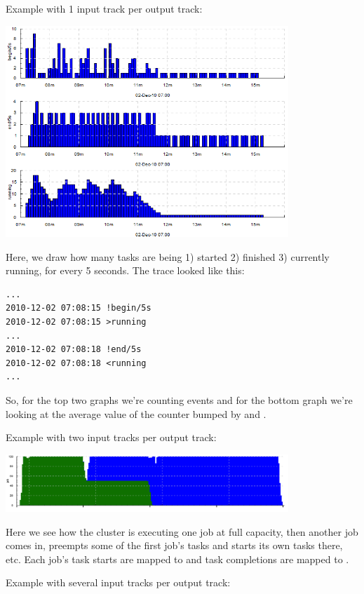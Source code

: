 \documentclass{article}
\begin{document}
Example with 1 input track per output track: 

\centerline{\includegraphics[width=0.8\textwidth]{pics/tplot/acount-begin-end-running.png}}

Here, we draw how many tasks are being 1) started 2) finished 3) currently running, for every 5 seconds. The trace looked like this:

\begin{verbatim}
...
2010-12-02 07:08:15 !begin/5s
2010-12-02 07:08:15 >running
...
2010-12-02 07:08:18 !end/5s
2010-12-02 07:08:18 <running
...
\end{verbatim}

So, for the top two graphs we're counting \hlverb{!} events and for the bottom graph we're looking at the average value of the counter bumped by \hlverb{>} and \hlverb{<}.

\pagebreak
Example with two input tracks per output track: 

\centerline{\includegraphics[width=0.8\textwidth]{pics/tplot/tplot-preemption.png}}

Here we see how the cluster is executing one job at full capacity, then another job comes in, preempts some of the first job's tasks and starts its own tasks there, etc. Each job's task starts are mapped to  and task completions are mapped to .

Example with several input tracks per output track: 
\end{document}
